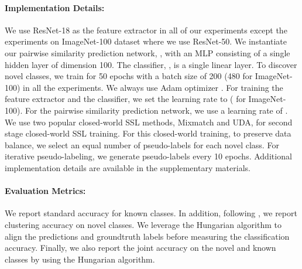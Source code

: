 \documentclass[runningheads]{eccv2022submission}
\begin{document}
 \vspace{-2mm}
\paragraph{\textbf{Implementation Details:}}
\label{para:implimentation}
We use ResNet-18 \cite{he2016deep} as the feature extractor in all of our experiments except the experiments on ImageNet-100 dataset where we use ResNet-50. We instantiate our pairwise similarity prediction network, , with an MLP consisting of a single hidden layer of dimension 100. The classifier, , is a single linear layer. To discover novel classes, we train for 50 epochs with a batch size of 200 (480 for ImageNet-100) in all the experiments. We always use Adam optimizer \cite{kingma2014adam}. For training the feature extractor and the classifier, we set the learning rate to  ( for ImageNet-100). For the pairwise similarity prediction network, we use a learning rate of . We use two popular closed-world SSL methods, Mixmatch\cite{NIPS2019_8749_MixMatch} and UDA\cite{xie2019unsupervised}, for second stage closed-world SSL training. For this closed-world training, to preserve data balance, we select an equal number of pseudo-labels for each novel class. For iterative pseudo-labeling, we generate pseudo-labels every 10 epochs. Additional implementation details are available in the supplementary materials.

\vspace{-2mm}
\paragraph{\textbf{Evaluation Metrics:}}
We report standard accuracy for known classes. In addition, following \cite{han2019learning,Han2020Automatically,cao2022openworld,fini2021unified}, we report clustering accuracy on novel classes. We leverage the Hungarian algorithm \cite{kuhn1955hungarian} to align the predictions and groundtruth labels before measuring the classification accuracy. Finally, we also report the joint accuracy on the novel and known classes by using the Hungarian algorithm.
\vspace{-2mm}
\end{document}

